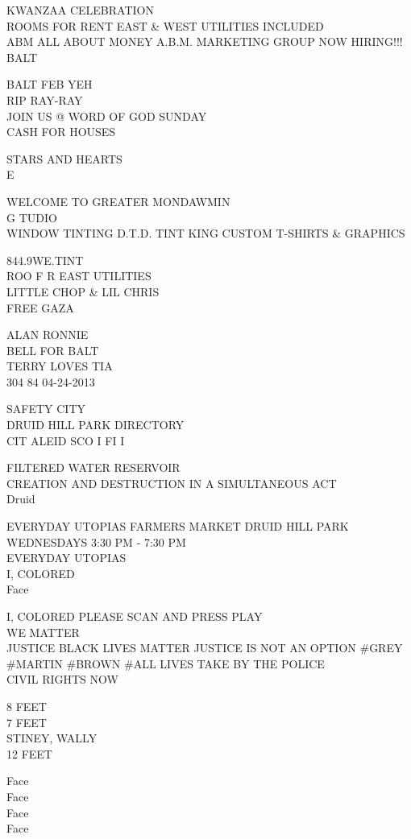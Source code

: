 \documentclass[10pt,letterpaper]{article}
\begin{document}
KWANZAA CELEBRATION\\
ROOMS FOR RENT EAST \& WEST UTILITIES INCLUDED\\
ABM ALL ABOUT MONEY A.B.M. MARKETING GROUP NOW HIRING!!!\\
BALT

BALT FEB YEH\\
RIP RAY{-}RAY\\
JOIN US @ WORD OF GOD SUNDAY\\
CASH FOR HOUSES

STARS AND HEARTS\\
E

WELCOME TO GREATER MONDAWMIN\\
G TUDIO\\
WINDOW TINTING D.T.D. TINT KING CUSTOM T{-}SHIRTS \& GRAPHICS

844.9WE.TINT\\
ROO F R EAST UTILITIES\\
LITTLE CHOP \& LIL CHRIS\\
FREE GAZA

ALAN RONNIE\\
BELL FOR BALT\\
TERRY LOVES TIA\\
304 84 04{-}24{-}2013

SAFETY CITY\\
DRUID HILL PARK DIRECTORY\\
CIT ALEID SCO I FI I

FILTERED WATER RESERVOIR\\
CREATION AND DESTRUCTION IN A SIMULTANEOUS ACT\\
Druid

EVERYDAY UTOPIAS FARMERS MARKET DRUID HILL PARK WEDNESDAYS 3:30 PM {-} 7:30 PM\\
EVERYDAY UTOPIAS\\
I, COLORED\\
Face

I, COLORED PLEASE SCAN AND PRESS PLAY\\
WE MATTER\\
JUSTICE BLACK LIVES MATTER JUSTICE IS NOT AN OPTION \#GREY \#MARTIN \#BROWN \#ALL LIVES TAKE BY THE POLICE\\
CIVIL RIGHTS NOW

8 FEET\\
7 FEET\\
STINEY, WALLY\\
12 FEET

Face\\
Face\\
Face\\
Face
\end{document}
